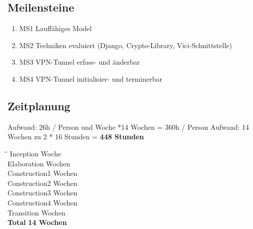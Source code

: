 \newpage

\subsection{Meilensteine}
\begin{enumerate}
	\item MS1 Lauffähiges Model
	\item MS2 Techniken evaluiert (Django, Crypto-Library, Vici-Schnittstelle)
	\item MS3 VPN-Tunnel erfass- und änderbar
	\item MS4 VPN-Tunnel initialisier- und terminerbar
\end{enumerate}

\subsection{Zeitplanung}
Aufwand: 26h / Person und Woche *14 Wochen = 360h / Person
Aufwand: 14 Wochen zu 2 * 16 Stunden = \textbf{448 Stunden}
\begin{tabbing}[H]
    \hspace*{6cm}\=\hspace*{6cm}\= \kill
    Inception  Woche \\
	Elaboration  Wochen \\
	Construction1  Wochen \\
	Construction2  Wochen \\
	Construction3  Wochen \\
	Construction4  Wochen \\
	Transition  Wochen \\
	\textbf{Total} \> \textbf{14 Wochen} \\
\end{tabbing}


